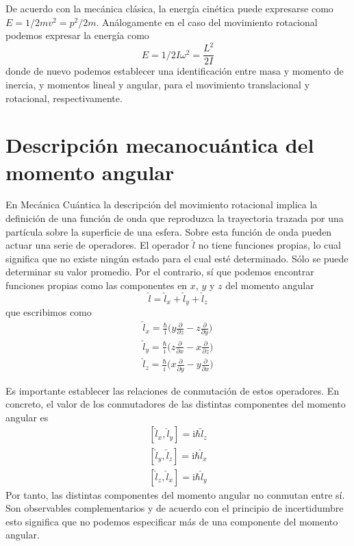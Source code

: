 De acuerdo con la mecánica clásica, la energía cinética 
puede expresarse como $E=1/2mv^2=p^2/2m$. Análogamente en 
el caso del movimiento rotacional podemos expresar la 
energía como 
\begin{equation}
    E=1/2I\omega^2=\frac{L^2}{2I}\label{eq:classicrote}
\end{equation}
donde de nuevo podemos establecer una identificación 
entre masa y momento de inercia, y momentos lineal y
angular, para el movimiento translacional y rotacional,
respectivamente.

\section{Descripción mecanocuántica del momento angular}
En Mecánica Cuántica la descripción del movimiento rotacional
implica la definición de una función de onda que reproduzca 
la trayectoria trazada por una partícula sobre la superficie
de una esfera. Sobre esta función de onda pueden actuar
una serie de operadores. El operador $\hat{l}$ no tiene 
funciones propias, lo cual significa que no existe ningún 
estado para el cual esté determinado. Sólo se puede determinar 
su valor promedio. Por el contrario, sí que podemos encontrar
funciones propias como las componentes en $x$, $y$ y
$z$ del momento angular
\begin{equation}
\hat{l}=\hat{l}_x+\hat{l}_y+\hat{l}_z
\end{equation}
que escribimos como
\begin{subequations}
    \begin{align}
\hat{l}_x = 
\frac{\hbar}{\mathrm{i}}\bigg(y\frac{\partial}{\partial z} 
- z\frac{\partial}{\partial y}\bigg) \\
\hat{l}_y = 
\frac{\hbar}{\mathrm{i}}\bigg(z\frac{\partial}{\partial x}
-  x\frac{\partial}{\partial z}\bigg) \\
\hat{l}_z = 
\frac{\hbar}{\mathrm{i}}\bigg(x\frac{\partial}{\partial y} 
- y\frac{\partial}{\partial x}\bigg) 
\end{align}
\end{subequations}

Es importante establecer las relaciones de conmutación
de estos operadores. En concreto, el valor de los 
conmutadores de las distintas componentes del momento
angular es 
\begin{subequations}
    \begin{align}
        [\hat{l}_x,\hat{l}_y] = \mathrm{i}\hbar \hat{l}_z\\
        [\hat{l}_y,\hat{l}_z] = \mathrm{i}\hbar \hat{l}_x\\
        [\hat{l}_z,\hat{l}_x] = \mathrm{i}\hbar \hat{l}_y
    \end{align}
\end{subequations}
Por tanto, las distintas componentes del momento angular no
conmutan entre sí. Son observables complementarios y
de acuerdo con el principio de incertidumbre esto significa
que no podemos especificar más de una componente del momento
angular.

